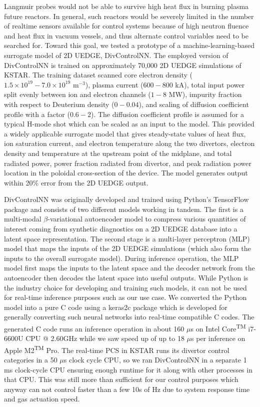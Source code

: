 Langmuir probes would not be able to survive high heat flux in burning plasma future reactors.
In general, such reactors would be severely limited in the number of realtime sensors available for control systems because of high neutron fluence and heat flux in vacuum vessels, and thus alternate control variables need to be searched for.
Toward this goal, we tested a prototype of a machine-learning-based surrogate model of 2D UEDGE, DivControlNN.
The employed version of DivControlNN is trained on approximately 70,000 2D UEDGE simulations of KSTAR.
The training dataset scanned core electron density ($1.5 \times 10^{19} - 7.0 \times 10^{19}$ m$^{-3}$), plasma current ($600-800$ kA), total input power split evenly between ion and electron channels ($1-8$ MW), impurity fraction with respect to Deuterium density ($0-0.04$), and scaling of diffusion coefficient profile with a factor ($0.6 - 2$).
The diffusion coefficient profile is assumed for a typical H-mode shot which can be scaled as an input to the model.
This provided a widely applicable surrogate model that gives steady-state values of heat flux, ion saturation current, and electron temperature along the two divertors, electron density and temperature at the upstream point of the midplane, and total radiated power, power fraction radiated from divertor, and peak radiation power location in the poloidal cross-section of the device.
The model generates output within 20\% error from the 2D UEDGE output.

DivControlNN was originally developed and trained using Python's TensorFlow package and consists of two different models working in tandem.
The first is a multi-modal $\beta$-variational autoencoder\cite{Higgins_2017_ICLR} model to compress various quantities of interest coming from synthetic diagnostics on a 2D UEDGE database into a latent space representation.
The second stage is a multi-layer perceptron (MLP) model that maps the inputs of the 2D UEDGE simulations (which also form the inputs to the overall surrogate model).
During inference operation, the MLP model first maps the inputs to the latent space and the decoder network from the autoencoder then decodes the latent space into useful outputs.
While Python is the industry choice for developing and training such models, it can not be used for real-time inference purposes such as our use case.
We converted the Python model into a pure C code using a keras2c\cite{keras2c} package which is developed for generally converting such neural networks into real-time compatible C codes.
The generated C code runs an inference operation in about 160 $\mu$s on Intel\textsuperscript{\textregistered} Core\textsuperscript{TM} i7-6600U CPU @ 2.60GHz while we saw speed up of up to 18 $\mu$s per inference on Apple\textsuperscript{\textregistered} M2\textsuperscript{TM} Pro.
The real-time PCS in KSTAR runs its divertor control categories in a 50 $\mu$s clock cycle CPU, so we ran DivControlNN in a separate 1 ms clock-cycle CPU ensuring enough runtime for it along with other processes in that CPU.
This was still more than sufficient for our control purposes which anyway can not control faster than a few 10s of Hz due to system response time and gas actuation speed.

